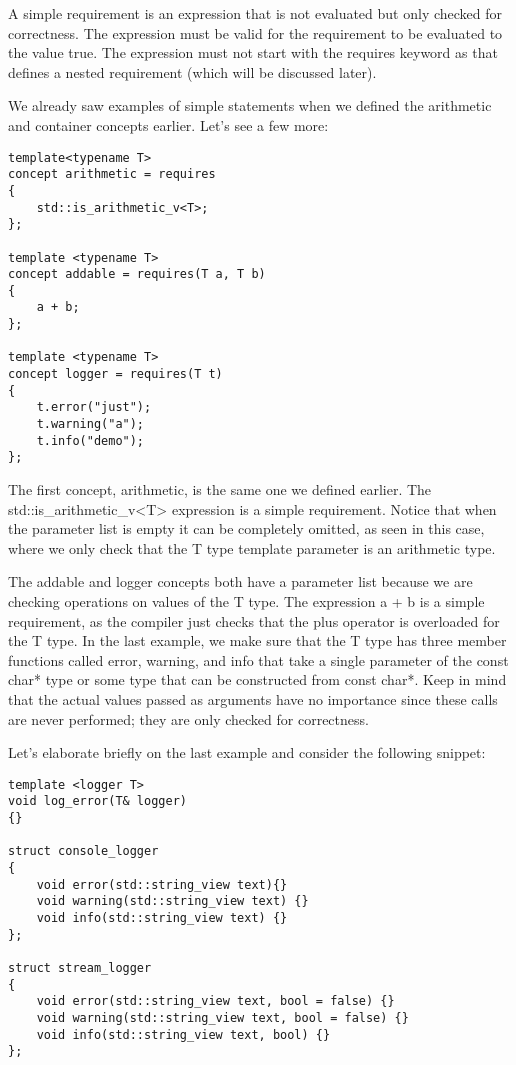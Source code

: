 A simple requirement is an expression that is not evaluated but only checked for correctness. The expression must be valid for the requirement to be evaluated to the value true. The expression must not start with the requires keyword as that defines a nested requirement (which will be discussed later).

We already saw examples of simple statements when we defined the arithmetic and container concepts earlier. Let’s see a few more:

\begin{lstlisting}[style=styleCXX]
template<typename T>
concept arithmetic = requires
{
	std::is_arithmetic_v<T>;
};

template <typename T>
concept addable = requires(T a, T b)
{
	a + b;
};

template <typename T>
concept logger = requires(T t)
{
	t.error("just");
	t.warning("a");
	t.info("demo");
};
\end{lstlisting}

The first concept, arithmetic, is the same one we defined earlier. The std::is\_arithmetic\_v<T> expression is a simple requirement. Notice that when the parameter list is empty it can be completely omitted, as seen in this case, where we only check that the T type template parameter is an arithmetic type.

The addable and logger concepts both have a parameter list because we are checking operations on values of the T type. The expression a + b is a simple requirement, as the compiler just checks that the plus operator is overloaded for the T type. In the last example, we make sure that the T type has three member functions called error, warning, and info that take a single parameter of the const char* type or some type that can be constructed from const char*. Keep in mind that the actual values passed as arguments have no importance since these calls are never performed; they are only checked for correctness.

Let’s elaborate briefly on the last example and consider the following snippet:

\begin{lstlisting}[style=styleCXX]
template <logger T>
void log_error(T& logger)
{}

struct console_logger
{
	void error(std::string_view text){}
	void warning(std::string_view text) {}
	void info(std::string_view text) {}
};

struct stream_logger
{
	void error(std::string_view text, bool = false) {}
	void warning(std::string_view text, bool = false) {}
	void info(std::string_view text, bool) {}
};
\end{lstlisting}

